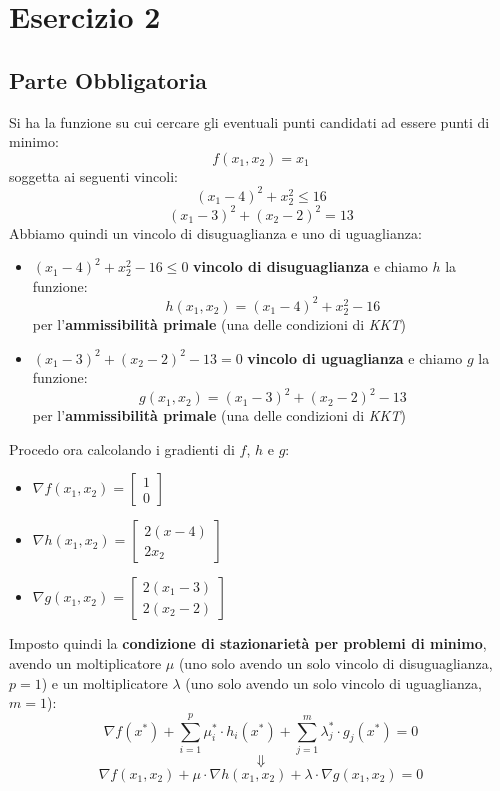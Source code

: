 \documentclass[a4paper,12pt, oneside]{book}
\begin{document}
\chapter{Esercizio 2}
\section{Parte Obbligatoria}
Si ha la funzione su cui cercare gli eventuali punti candidati ad
essere punti di minimo:
\[f(x_1,x_2)=x_1\]
soggetta ai seguenti vincoli:
\[(x_1-4)^2+x_2^2\leq 16\]
\[(x_1-3)^2+(x_2-2)^2=13\]
Abbiamo quindi un vincolo di disuguaglianza e uno di uguaglianza:
\begin{itemize}
  \item $ (x_1-4)^2+x_2^2-16\leq 0$ \textbf{vincolo di disuguaglianza}
  e chiamo $h$ la funzione:
  \[h(x_1,x_2)= (x_1-4)^2+x_2^2-16\]
  per l'\textbf{ammissibilità primale} (una delle condizioni di \textit{KKT})
  \item $(x_1-3)^2+(x_2-2)^2-13=0$ \textbf{vincolo di uguaglianza} e
  chiamo $g$ la funzione:
  \[g(x_1,x_2)=(x_1-3)^2+(x_2-2)^2-13\]
  per l'\textbf{ammissibilità primale} (una delle condizioni di \textit{KKT})
\end{itemize}
\newpage
Procedo ora calcolando i gradienti di $f$, $h$ e $g$:
\begin{itemize}
  \item $\nabla f(x_1,x_2)=\left[
    \begin{matrix}
      1\\
      0
    \end{matrix}
  \right]$
  \item $\nabla h(x_1,x_2)=\left[
    \begin{matrix}
      2(x-4)\\
      2x_2
    \end{matrix}
  \right]$
  \item $\nabla g(x_1,x_2)=\left[
    \begin{matrix}
      2(x_1-3)\\
      2(x_2-2)
    \end{matrix}
  \right]$
\end{itemize}
Imposto quindi la \textbf{condizione di stazionarietà per problemi di
  minimo}, avendo un moltiplicatore $\mu$ (uno solo avendo un solo
vincolo di disuguaglianza, $p=1$) e un moltiplicatore $\lambda$ (uno solo
avendo un solo vincolo di uguaglianza, $m=1$):
\[\nabla f(x^*)+\sum_{i=1}^p\mu_i^*\cdot
  h_i(x^*)+\sum_{j=1}^m\lambda_j^*\cdot g_j(x^*)=0\]
\[\Downarrow\]
\[\nabla f(x_1,x_2)+\mu\cdot\nabla h(x_1,x_2)+\lambda\cdot\nabla
  g(x_1,x_2)=0\]
\end{document}
